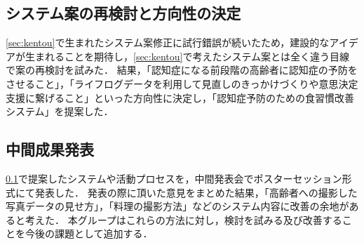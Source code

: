 \documentclass[../report]{subfiles}
\begin{document}
\subsection{システム案の再検討と方向性の決定}\label{sec:saikentou}
\ref{sec:kentou}で生まれたシステム案修正に試行錯誤が続いたため，建設的なアイデアが生まれることを期待し，\ref{sec:kentou}で考えたシステム案とは全く違う目線で案の再検討を試みた．
結果，「認知症になる前段階の高齢者に認知症の予防をさせること」，「ライフログデータを利用して見直しのきっかけづくりや意思決定支援に繋げること」といった方向性に決定し，「認知症予防のための食習慣改善システム」を提案した．

\subsection{中間成果発表}
\ref{sec:saikentou}で提案したシステムや活動プロセスを，中間発表会でポスターセッション形式にて発表した．
発表の際に頂いた意見をまとめた結果，「高齢者への撮影した写真データの見せ方」，「料理の撮影方法」などのシステム内容に改善の余地があると考えた．
本グループはこれらの方法に対し，検討を試みる及び改善することを今後の課題として追加する．
\end{document}
